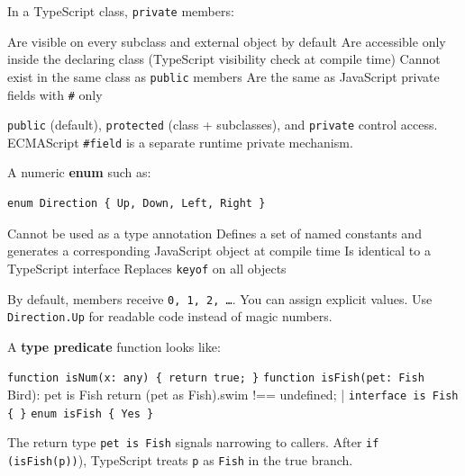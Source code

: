\question[4]
In a TypeScript class, \lstinline[style=tsinline]|private| members:
\begin{choices}
  \choice Are visible on every subclass and external object by default
  \CorrectChoice Are accessible only inside the declaring class (TypeScript visibility check at compile time)
  \choice Cannot exist in the same class as \lstinline[style=tsinline]|public| members
  \choice Are the same as JavaScript private fields with \texttt{\#} only
\end{choices}
\begin{solution}
  \lstinline[style=tsinline]|public| (default), \lstinline[style=tsinline]|protected| (class + subclasses), and \lstinline[style=tsinline]|private| control access. ECMAScript \lstinline[style=tsinline]|#field| is a separate runtime private mechanism.
\end{solution}

\question[4]
A numeric \textbf{enum} such as:
\begin{lstlisting}[style=ts]
enum Direction { Up, Down, Left, Right }
\end{lstlisting}
\begin{choices}
  \choice Cannot be used as a type annotation
  \CorrectChoice Defines a set of named constants and generates a corresponding JavaScript object at compile time
  \choice Is identical to a TypeScript interface
  \choice Replaces \lstinline[style=tsinline]|keyof| on all objects
\end{choices}
\begin{solution}
  By default, members receive \texttt{0, 1, 2, \ldots}. You can assign explicit values. Use \lstinline[style=tsinline]|Direction.Up| for readable code instead of magic numbers.
\end{solution}

\question[4]
A \textbf{type predicate} function looks like:
\begin{choices}
  \choice \lstinline[style=tsinline]|function isNum(x: any) { return true; }|
  \CorrectChoice \lstinline[style=tsinline]|function isFish(pet: Fish | Bird): pet is Fish { return (pet as Fish).swim !== undefined; }|
  \choice \lstinline[style=tsinline]|interface is Fish { }|
  \choice \lstinline[style=tsinline]|enum isFish { Yes }|
\end{choices}
\begin{solution}
  The return type \lstinline[style=tsinline]|pet is Fish| signals narrowing to callers. After \lstinline[style=tsinline]|if (isFish(p))|), TypeScript treats \lstinline[style=tsinline]|p| as \lstinline[style=tsinline]|Fish| in the true branch.
\end{solution}

